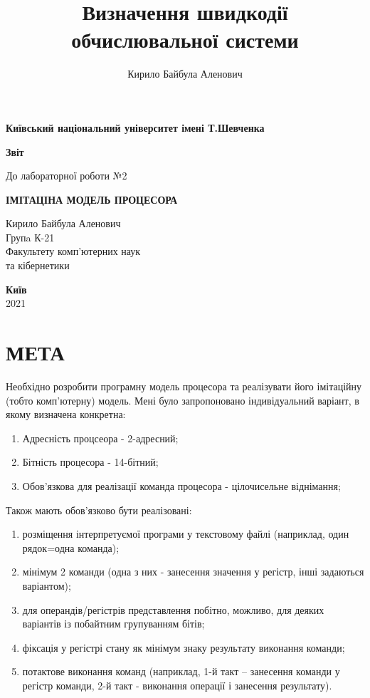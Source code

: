 \documentclass[a4paper,12pt]{report}
\author{Кирило Байбула Аленович}
\title{Визначення швидкодії обчислювальної системи}
\begin{document}
\begin{titlepage}
	\begin{center}
		\Large
		\textbf{Київський національний університет імені Т.Шевченка}
		\vspace{5cm}

		\Huge
		\textbf{Звіт}

		\LARGE
		До лабораторної роботи №2
		\vspace{0.5cm}

		\textbf{ІМІТАЦІНА МОДЕЛЬ ПРОЦЕСОРА}
		\vfill
	\end{center}

	\begin{FlushRight}
		Кирило Байбула Аленович \\
		Групa К-21 \\
		Факультету комп’ютерних наук \\
		та кібернетики
	\end{FlushRight}

	\vspace{0.5cm}

	\begin{center}
		\textbf{Київ} \\
		2021
	\end{center}

\end{titlepage}
\clearpage

\section{МЕТА}
Необхідно розробити програмну модель процесора та реалізувати його
імітаційну (тобто комп’ютерну) модель. Мені було запропоновано індивідуальний варіант,
в якому визначена конкретна:
\begin{enumerate}
    \item{Адресність процсеора - 2-адресний;}
    \item{Бітність процесора - 14-бітний;}
    \item{Обов'язкова для реалізації команда процесора - цілочисельне віднімання;}
\end{enumerate}
Також мають обов'язково бути реалізовані:
\begin{enumerate}
    \item{розміщення інтерпретуємої програми у текстовому файлі (наприклад, один рядок=одна команда);}
    \item{мінімум 2 команди (одна з них - занесення значення у регістр, інші задаються варіантом);}
    \item{для операндів/регістрів представлення побітно, можливо, для деяких варіантів із побайтним групуванням бітів;}
    \item{фіксація у регістрі стану  як мінімум знаку ре­зуль­та­ту виконання команди;}
    \item{потактове виконання команд (наприклад, 1-й такт – занесення команди у регістр команди, 2-й такт -  виконання операції і занесення результату).}
\end{enumerate}
\clearpage
\end{document}

